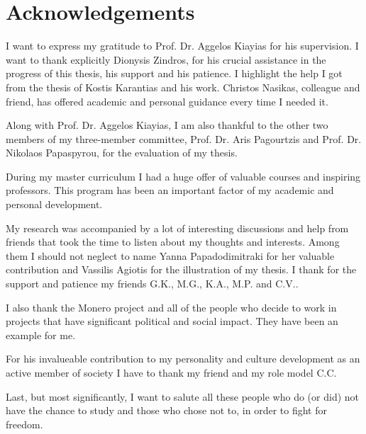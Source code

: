 \chapter*{Acknowledgements}
I want to express my gratitude to Prof. Dr. Aggelos Kiayias for his supervision. I want to thank explicitly Dionysis Zindros, for his crucial assistance in the progress of this thesis, his support and his patience. I highlight the help I got from the thesis of Kostis Karantias and his work. Christos Nasikas, colleague and friend, has offered academic and personal guidance every time I needed it.

Along with Prof. Dr. Aggelos Kiayias, I am also thankful to the other two members of my three-member committee, Prof. Dr. Aris Pagourtzis and Prof. Dr. Nikolaos Papaspyrou, for the evaluation of my thesis.

During my master curriculum I had a huge offer of valuable courses and inspiring professors. This program has been an important factor of my academic and personal development.

My research was accompanied by a lot of interesting discussions and help from friends that took the time to listen about my thoughts and interests. Among them I should not neglect to name Yanna Papadodimitraki for her valuable contribution and Vassilis Agiotis for the illustration of my thesis. I thank for the support and patience my friends G.K., M.G., K.A., M.P. and C.V..

I also thank the Monero project and all of the people who decide to work in projects that have significant political and social impact. They have been an example for me.

For his invalueable contribution to my personality and culture development as an active member of society I have to thank my friend and my role model C.C.

Last, but most significantly, I want to salute all these people who do (or did) not have the chance to study and those who chose not to, in order to fight for freedom.
%
